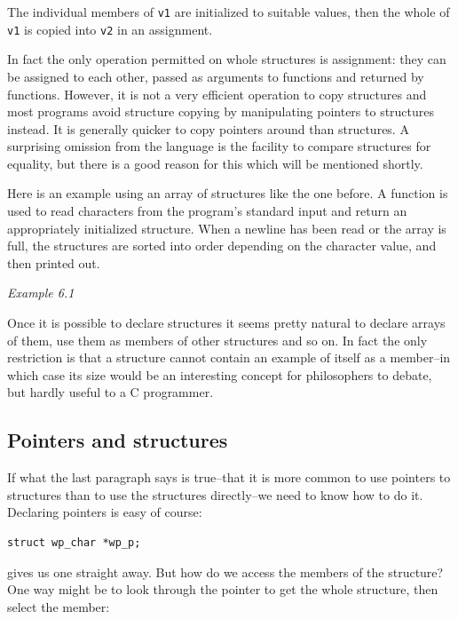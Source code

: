   The individual members of \texttt{v1} are initialized to suitable
   values, then the whole of \texttt{v1} is copied into \texttt{v2} in
   an assignment.


  In fact the only operation permitted on whole structures is assignment:
   they can be assigned to each other, passed as arguments to functions and
   returned by functions. However, it is not a very efficient operation to copy
   structures and most programs avoid structure copying by manipulating
   pointers to structures instead. It is generally quicker to copy pointers
   around than structures. A surprising omission from the language is the
   facility to compare structures for equality, but there is a good reason for
   this which will be mentioned shortly.


  Here is an example using an array of structures like the one before.
   A function is used to read characters from the program's standard input and
   return an appropriately initialized structure. When a newline has been read
   or the array is full, the structures are sorted into order depending on the
   character value, and then printed out.


  \begin{center}\textit{Example 6.1}\end{center}


  Once it is possible to declare structures it seems pretty natural to
   declare arrays of them, use them as members of other structures and so on.
   In fact the only restriction is that a structure cannot contain an example
   of itself as a member--in which case its size would be an interesting
   concept for philosophers to debate, but hardly useful to a C programmer.


  \subsection{Pointers and structures}
   

   If what the last paragraph says is true--that it is more common to
    use pointers to structures than to use the structures directly--we need
    to know how to do it. Declaring pointers is easy of course:


   \begin{Verbatim}
struct wp_char *wp_p;
\end{Verbatim}

   gives us one straight away. But how do we access the members of the
    structure? One way might be to look through the pointer to get the whole
    structure, then select the member:



